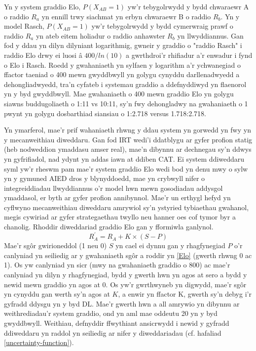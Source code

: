 Yn y system graddio Elo, $P(X_{AB} = 1)$ yw'r tebygolrwydd y bydd chwaraewr A o raddio $R_a$ yn ennill trwy siachmat yn erbyn chwaraewr B o raddio $R_b$. Yn y model Rasch, $P(X_{AB} = 1)$ yw'r tebygolrwydd y bydd cymerwraig prawf o raddio $R_a$ yn ateb eitem holiadur o raddio anhawster $R_b$ yn llwyddiannus. Gan fod y ddau yn dilyn dilyniant logarithmig, gwneir y graddio o "raddio Rasch" i raddio Elo drwy ei luosi â $400/ln(10)$ a gwrthdroi'r rhifiadur a'r enwadur i fynd o Elo i Rasch. Roedd y gwahaniaeth yn sylfaen y logarithm a'r ychwanegiad o ffactor taeniad o 400 mewn gwyddbwyll yn golygu cynyddu darllenadwyedd a dehongliadwyedd, tra'n cyfateb i systemau graddio a ddefnyddiwyd yn flaenorol yn y byd gwyddbwyll. Mae gwahaniaeth o 400 mewn graddio Elo yn golygu siawns buddugoliaeth o 1:11 vs 10:11, sy'n fwy dehongladwy na gwahaniaeth o 1 pwynt yn golygu dosbarthiad siansiau o 1:2.718 versus 1.718:2.718.

Yn ymarferol, mae'r prif wahaniaeth rhwng y ddau system yn gorwedd yn fwy yn y mecanweithiau diweddaru. Gan fod IRT wedi'i ddatblygu ar gyfer profion statig (heb nodweddion ymaddasu amser real), mae'n dibynnu ar dechnegau sy'n ddwys yn gyfrifiadol, nad ydynt yn addas iawn at ddiben CAT. Ei system ddiweddaru syml yw'r rheswm pam mae'r system graddio Elo wedi bod yn denu mwy o sylw yn y gymuned AIED dros y blynyddoedd, mae \cite{pelanek_applications_2016} yn crybwyll nifer o integreiddiadau llwyddiannus o'r model hwn mewn gosodiadau addysgol ymaddasol, er byth ar gyfer profion annibynnol. Mae'r un erthygl hefyd yn cyflwyno mecanweithiau diweddaru amrywiol sy'n ystyried tybiaethau gwahanol, megis cywiriad ar gyfer strategaethau twyllo neu hanner oes cof tymor byr a chanolig. Rhoddir diweddariad graddio Elo gan y fformiwla ganlynol.
\begin{equation}
    R_{A}^{\prime}= R_A+K \times{(S-P)}
    \label{Update Elo}
\end{equation}
Mae'r sgôr gwirioneddol (1 neu 0) $S$ yn cael ei dynnu gan y rhagfynegiad $P$ o'r canlyniad yn seiliedig ar y gwahaniaeth sgôr a roddir yn \ref{Elo} (gwerth rhwng 0 ac 1). Os yw canlyniad yn sicr (mwy na gwahaniaeth graddio o 800) ac mae'r canlyniad yn dilyn y rhagfynegiad, bydd y gwerth hwn yn agos at sero a bydd y newid mewn graddio yn agos at 0. Os yw'r gwrthwyneb yn digwydd, mae'r sgôr yn cynyddu gan werth sy'n agos at $K$, a enwir yn ffactor K, gwerth sy'n debyg i'r gyfradd ddysgu yn y byd DL. Mae'r gwerth hwn a all amrywio yn dibynnu ar weithrediadau'r system graddio, ond yn aml mae oddeutu 20 yn y byd gwyddbwyll. Weithiau, defnyddir ffwythiant ansicrwydd i newid y gyfradd ddiweddaru yn raddol yn seiliedig ar nifer y diweddariadau (cf. hafaliad \ref{uncertainty-function}).

